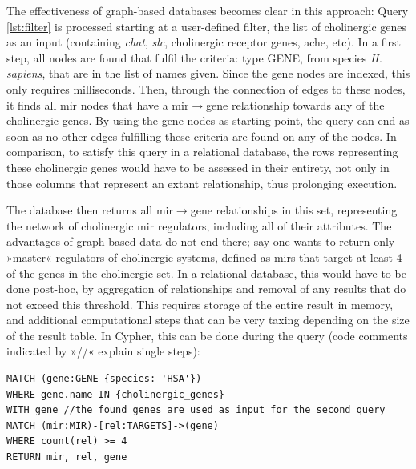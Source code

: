 The effectiveness of graph-based databases becomes clear in this approach: Query \ref{lst:filter} is processed starting at a user-defined filter, the list of cholinergic genes as an input (containing \textit{\ac{chat}}, \textit{\ac{slc}}, cholinergic receptor genes, \acl{ache}, etc). In a first step, all nodes are found that fulfil the criteria: type GENE, from species \textit{H. sapiens}, that are in the list of names given. Since the gene nodes are indexed, this only requires milliseconds. Then, through the connection of edges to these nodes, it finds all \ac{mir} nodes that have a \ac{mir}$\to$gene relationship towards any of the cholinergic genes. By using the gene nodes as starting point, the query can end as soon as no other edges fulfilling these criteria are found on any of the nodes. In comparison, to satisfy this query in a relational database, the rows representing these cholinergic genes would have to be assessed in their entirety, not only in those columns that represent an extant relationship, thus prolonging execution.

The database then returns all \ac{mir}$\to$gene relationships in this set, representing the network of cholinergic \ac{mir} regulators, including all of their attributes. The advantages of graph-based data do not end there; say one wants to return only »master« regulators of cholinergic systems, defined as \acp{mir} that target at least 4 of the genes in the cholinergic set. In a relational database, this would have to be done post-hoc, by aggregation of relationships and removal of any results that do not exceed this threshold. This requires storage of the entire result in memory, and additional computational steps that can be very taxing depending on the size of the result table. In Cypher, this can be done during the query (code comments indicated by »\textcolor{dkgreen}{//}« explain single steps):

\pagebreak

\begin{lstlisting}[label=lst:filter2, caption=Two-stage Filtering,
language=Cypher]
MATCH (gene:GENE {species: 'HSA'})
WHERE gene.name IN {cholinergic_genes}
WITH gene //the found genes are used as input for the second query
MATCH (mir:MIR)-[rel:TARGETS]->(gene)
WHERE count(rel) >= 4
RETURN mir, rel, gene
\end{lstlisting}

